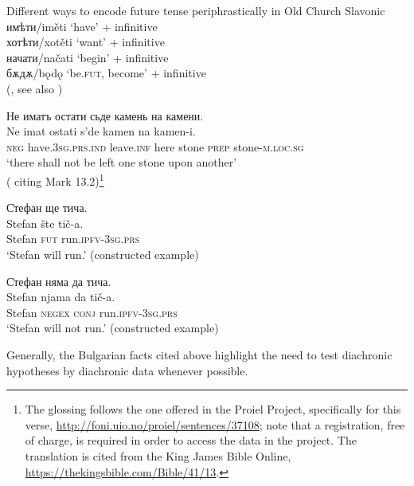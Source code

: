 \documentclass[output=paper,colorlinks=true, citecolor=brown]{langscibook}
\begin{document}
\ea Different ways to encode future tense periphrastically in Old Church Slavonic\\ \label{ex:bul:diach-4}
  \ea имѣти/iměti `have' + infinitive\\ \label{ex:bul:diach-4a}
  \ex хотѣти/xotěti `want'  + infinitive\\ \label{ex:bul:diach-4b}
\ex начати/načati `begin' + infinitive\\
\ex бѫдѫ/bǫdǫ `be.\textsc{fut}, become' + infinitive \\
(\cite[418]{Duridanov1991}, see also \cite[288-294]{Slavova217})
\z \z

\ea\label{ex:bul:diach-5} Не иматъ остати сьде камень на камени.\\ 
  	\gll Ne imat ostati s'de kamen na kamen-i.\\
  	\textsc{neg} have.\textsc{3sg.prs.ind} leave.\textsc{inf} here stone \textsc{prep} stone-\textsc{m.loc.sg}\\
    \glt `there shall not be left one stone upon another'\\ (\cite[418]{Duridanov1991} citing Mark 13.2)\footnote{The glossing follows the one offered in the Proiel Project, specifically for this verse, \href{http://foni.uio.no/proiel/sentences/37108}{http://foni.uio.no/proiel/sentences/37108}; note that a registration, free of charge, is required in order to access the data in the project. The translation is cited from the King James Bible Online, \href{https://thekingsbible.com/Bible/41/13}{https://thekingsbible.com/Bible/41/13}.}
\z 

\ea С̇тефан ще тича.\label{ex:bul:diach-6} \\ 
  	\gll Stefan šte tič-a. \\
     Stefan \textsc{fut} run.\textsc{ipfv}-\textsc{3sg}.\textsc{prs}\\
\glt `Stefan will run.' (constructed example)
  \z
  
\ea С̇тефан няма да тича.\\ \label{ex:bul:diach-3}
  	\gll Stefan njama da  tič-a.\\
  	Stefan \textsc{negex} \textsc{conj} run.\textsc{ipfv}-\textsc{3sg}.\textsc{prs} \\
    \glt `Stefan will not run.' (constructed example)
\z 

Generally, the Bulgarian facts cited above highlight the need to test diachronic hypotheses by diachronic data whenever possible.
\end{document}
